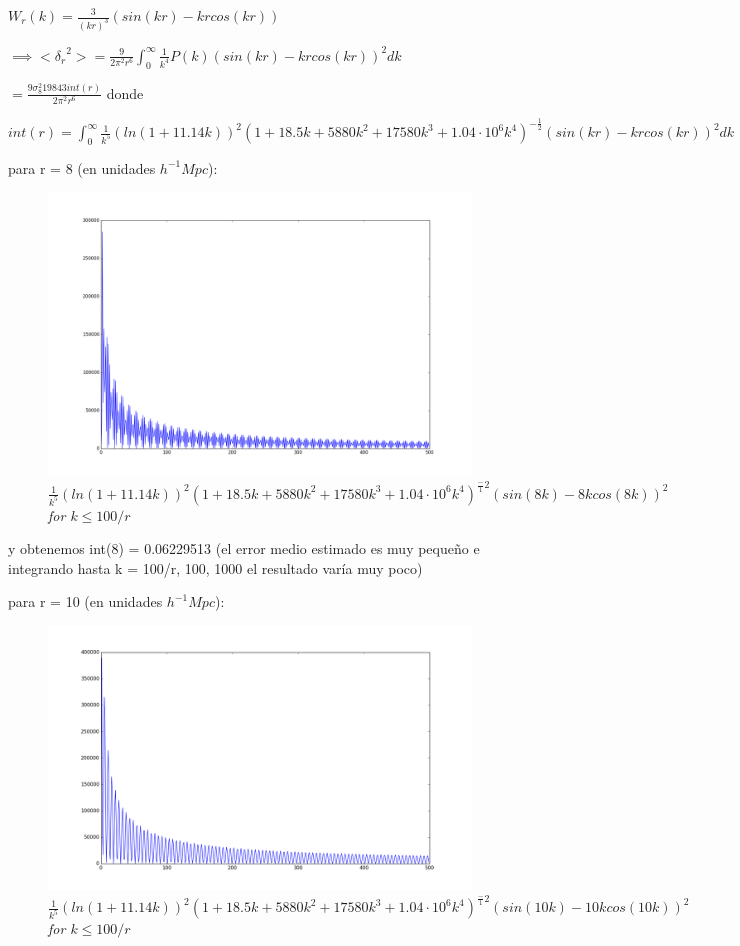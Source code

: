 \documentclass[12pt]{book}
\begin{document}
$W_r(k) = \frac{3}{(kr)^3}(sin(kr) - kr cos(kr))$ 

$\implies <{\delta_r}^2> = \frac{9 }{2\pi^2 r^6}\int_0^\infty{\frac{1}{k^4} P(k)(sin(kr) - k r cos(kr))^2 dk }$

$= \frac{9 \sigma_8^2 19843 int(r)}{2\pi^2 r^6}$ donde 

$int(r) = \int_0^\infty{\frac{1}{k^5}(ln(1+11.14k))^2 
(1+18.5k + 5880k^2+17580k^3 + 1.04 \cdot 10^6 k^4)^{-\frac{1}{2}}(sin(kr) - k r cos(kr))^2 dk }$


para r = 8 (en unidades $h^{-1}Mpc$):


\begin{figure}[H]
 \centering
 \includegraphics[scale=0.5]{graf.png}
 \caption{\emph{$ \frac{1}{k^5}(ln(1+11.14k))^2 
(1+18.5k + 5880k^2+17580k^3 + 1.04 \cdot 10^6 k^4)^{\frac-{1}{2}}(sin(8k) - 8 k  cos(8k))^2$ for $k\le 100/r$}}
\end{figure}

y obtenemos int(8) = 0.06229513 (el error medio estimado es muy pequeño e integrando hasta k = 100/r, 100, 1000 el resultado varía muy poco)

para r = 10 (en unidades $h^{-1}Mpc$):
\begin{figure}[H]
 \centering
 \includegraphics[scale=0.5]{graf2.png}
 \caption{\emph{$ \frac{1}{k^5}(ln(1+11.14k))^2 
(1+18.5k + 5880k^2+17580k^3 + 1.04 \cdot 10^6 k^4)^{\frac-{1}{2}}(sin(10 k) - 10 k  cos(10k))^2$ for $k\le 100/r$}}
\end{figure}
\end{document}
